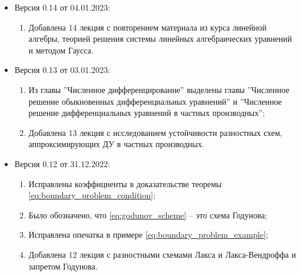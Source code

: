 \documentclass{article}
\begin{document}
\begin{itemize}[nosep]
\item Версия 0.14 от 04.01.2023:
	\begin{enumerate}[nosep]
		\item Добавлена 14 лекция с повторением материала из курса
			линейной алгебры, теорией решения системы линейных
			алгебраических уравнений и методом Гаусса.
	\end{enumerate}
\item Версия 0.13 от 03.01.2023:
	\begin{enumerate}[nosep]
		\item Из главы ''Численное дифференцирование'' выделены главы
			''Численное решение обыкновенных дифференциальных
			уравнений'' и ''Численное решение дифференциальных
			уравнений в частных производных'';
		\item Добавлена 13 лекция с исследованием устойчивости
			разностных схем, аппроксимирующих ДУ в частных
			производных.
	\end{enumerate}
\item Версия 0.12 от 31.12.2022:
	\begin{enumerate}[nosep]
		\item Исправлены коэффициенты в доказательстве теоремы
			\eqref{eq:boundary_problem_condition};
		\item Было обозначено, что \eqref{eq:godunov_scheme} -- это
			схема Годунова;
		\item Исправлена опечатка в примере
			\eqref{eq:boundary_problem_example};
		\item Добавлена 12 лекция с разностными схемами Лакса и
			Лакса-Вендроффа и запретом Годунова.
	\end{enumerate}
\end{itemize}
\end{document}
